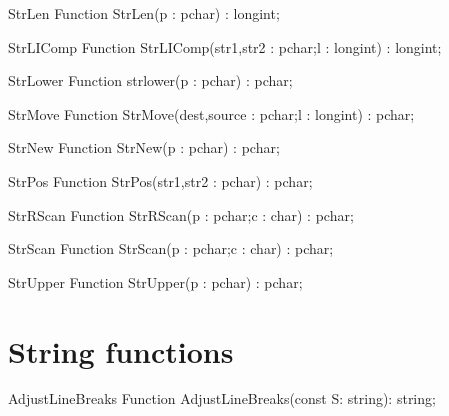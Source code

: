  
\begin{function}{StrLen}
\Declaration
Function StrLen(p : pchar) : longint;
\Description
\Errors
\SeeAlso
\end{function}

 
\begin{function}{StrLIComp}
\Declaration
Function StrLIComp(str1,str2 : pchar;l : longint) : longint;
\Description
\Errors
\SeeAlso
\end{function}

 
\begin{function}{StrLower}
\Declaration
Function strlower(p : pchar) : pchar;
\Description
\Errors
\SeeAlso
\end{function}

 
\begin{function}{StrMove}
\Declaration
Function StrMove(dest,source : pchar;l : longint) : pchar;
\Description
\Errors
\SeeAlso
\end{function}

 
\begin{function}{StrNew}
\Declaration
Function StrNew(p : pchar) : pchar;
\Description
\Errors
\SeeAlso
\end{function}

 
\begin{function}{StrPos}
\Declaration
Function StrPos(str1,str2 : pchar) : pchar;
\Description
\Errors
\SeeAlso
\end{function}

 
\begin{function}{StrRScan}
\Declaration
Function StrRScan(p : pchar;c : char) : pchar;
\Description
\Errors
\SeeAlso
\end{function}

 
\begin{function}{StrScan}
\Declaration
Function StrScan(p : pchar;c : char) : pchar;
\Description
\Errors
\SeeAlso
\end{function}

 
\begin{function}{StrUpper}
\Declaration
Function StrUpper(p : pchar) : pchar;
\Description
\Errors
\SeeAlso
\end{function}

\section{String functions}

\begin{function}{AdjustLineBreaks}
\Declaration
Function AdjustLineBreaks(const S: string): string;
\Description
\Errors
\SeeAlso
\end{function}

